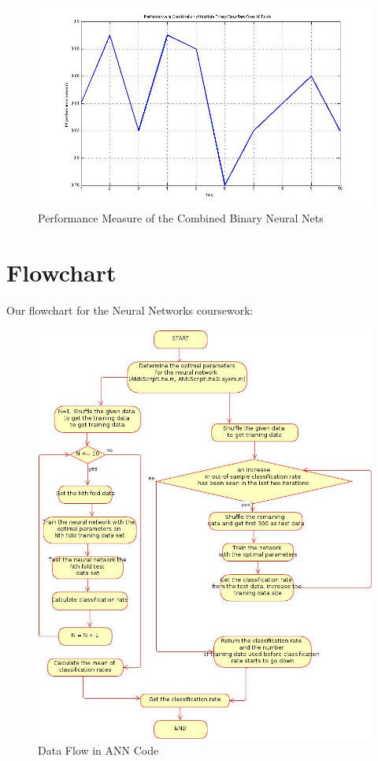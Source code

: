\documentclass[a4paper,12pt,oneside,final]{report}
\newenvironment{changemargin}[2]{\begin{list}{}{%
\setlength{\topsep}{0pt}%
\setlength{\leftmargin}{0pt}%
\setlength{\rightmargin}{0pt}%
\setlength{\listparindent}{\parindent}%
\setlength{\itemindent}{\parindent}%
\setlength{\parsep}{0pt plus 1pt}%
\addtolength{\leftmargin}{#1}%
\addtolength{\rightmargin}{#2}%
}\item }{\end{list}}
\begin{document}
\begin{figure}[!h]
\begin{changemargin}{-20mm}{-20mm}
\center
\includegraphics[scale=0.5]{multi_perf.jpg}
\caption{Performance Measure of the Combined Binary Neural Nets}
\end{changemargin}
\end{figure}

\section{Flowchart}
Our flowchart for the Neural Networks coursework:
\begin{figure}[!h]
\begin{changemargin}{-20mm}{-20mm}
\center
\includegraphics[scale=0.5]{overall.jpg}
\caption{Data Flow in ANN Code}
\end{changemargin}
\end{figure}
\end{document}
